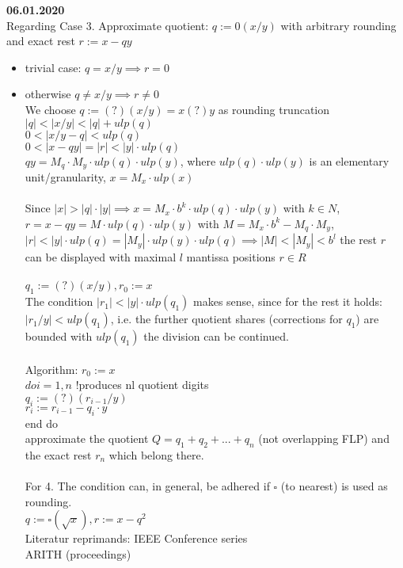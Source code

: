 \documentclass[a4paper, 11pt]{report}
\theoremstyle{break}
\theoremstyle{proofstyle}
\begin{document}
    \textbf{06.01.2020} \\
    Regarding Case 3. Approximate quotient: $q:=0(x/y)$ with arbitrary rounding and exact rest $r:=x-qy$ \\
    \begin{itemize}
        \item trivial case: $q=x/y\implies r=0$ 
        \item otherwise $q\not=x/y \implies r\not=0$ \\
        We choose $q:=(?)(x/y)=x(?)y$ as rounding truncation \\
        \implies $|q|<|x/y|<|q|+ulp(q)$ \\
        \implies $0<|x/y-q|<ulp(q)$ \\
        \implies $0<|x-qy|=|r|<|y|\cdot ulp(q)$ \\
        $qy=M_q\cdot M_y\cdot ulp(q)\cdot ulp(y)$, where $ulp(q)\cdot ulp(y)$ is an elementary unit/granularity, $x=M_x\cdot ulp(x)$ \\
        \\
        Since $|x|>|q|\cdot |y|\implies x=M_x\cdot b^k\cdot ulp(q)\cdot ulp(y)$ with $k\in N$, $r=x-qy=M\cdot ulp(q)\cdot ulp(y)$ with $M=M_x\cdot b^k-M_q\cdot M_y$, $|r|<|y|\cdot ulp(q)=|M_y|\cdot ulp(y)\cdot ulp(q)\implies |M|<|M_y|<b^l$ \implies the rest $r$ can be displayed with maximal $l$ mantissa positions \implies $r\in R$ \\
        \\
        $q_1:=(?)(x/y), r_0:=x$ \\
        The condition $|r_1|<|y|\cdot ulp(q_1)$ makes sense, since for the rest it holds: $|r_1/y|<ulp(q_1)$, i.e. the further quotient shares (corrections for $q_1$) are bounded with $ulp(q_1)$ \implies the division can be continued. \\
        \\
        Algorithm: $r_0:=x$ \\
        $do i=1,n$ !produces n\cdot l quotient digits \\
        $q_i:=(?)(r_{i-1}/y)$ \\
        $r_i:=r_{i-1}-q_i\cdot y$ \\
        end do\\
        \implies approximate the quotient $Q=q_1+q_2+...+q_n$ (not overlapping FLP) and the exact rest $r_n$ which belong there. \\
        \\
        For 4. 
        The condition can, in general, be adhered if $\square$ (to nearest) is used as rounding. \\
        $q:=\square (\sqrt{x}), r:=x-q^2$ \\
        Literatur reprimands: IEEE Conference series\\
        ARITH (proceedings) \\
    \end{itemize} \\
    
\end{document}
